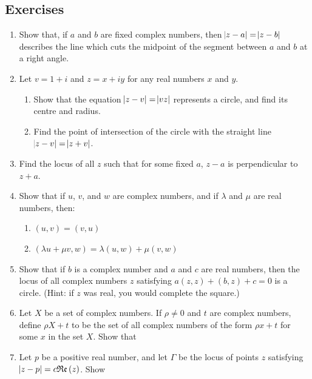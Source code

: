 \documentclass[a4paper,10pt,titlepage]{article}
\theoremstyle{definition}
\newcommand*\realp[1]{ \mathfrak{Re} \left ( {#1} \right )  }
\newcommand{\hard}{\refstepcounter{enumi}\item[$^\star$\theenumi.]}
\begin{document}
\subsection*{Exercises}
\begin{enumerate}
  \item Show that, if $ a $ and $ b $ are fixed complex numbers, then $ \abs{z - a} = \abs{z - b} $ describes the line which
        cuts the midpoint of the segment between $ a $ and $ b $ at a right angle.
  \item Let $ v = 1 + i $ and $ z = x + iy $ for any real numbers $ x $ and $ y $.
    \begin{enumerate}
      \item Show that the equation $ \abs{z - v} = \abs{vz} $ represents a circle, and find its
            centre and radius.
      \item Find the point of intersection of the circle with the straight line $ \abs{z - v} = \abs{z + v} $.
    \end{enumerate}
  \item Find the locus of all $ z $ such that for some fixed $ a $, $ z - a $ is perpendicular to $ z + a $.
  \item Show that if $ u $, $ v $, and $ w $ are complex numbers, and if $ \lambda $ and $ \mu $ are real
        numbers, then:
    \begin{enumerate}
      \item $ (u, v) = (v, u) $
      \item $ (\lambda u + \mu v, w) = \lambda(u, w) + \mu(v, w) $
    \end{enumerate}
  \hard Show that if $ b $ is a complex number and $ a $ and $ c $ are real numbers, then the locus of all complex numbers
        $ z $ satisfying $ a(z,z) + (b,z) + c = 0 $ is a circle. (Hint: if $ z $ was real, you would complete the square.)
  \item Let $ X $ be a set of complex numbers. If $ \rho \neq 0 $ and $ t $ are complex numbers, define $ \rho X + t $ to be
        the set of all complex numbers of the form $ \rho x + t $ for some $ x $ in the set $ X $. Show that
  \item Let $ p $ be a positive real number, and let $ \Gamma $ be the locus of points $ z $ satisfying $ \abs{z - p} = c\realp{z} $. Show

\end{enumerate}
\end{document}
